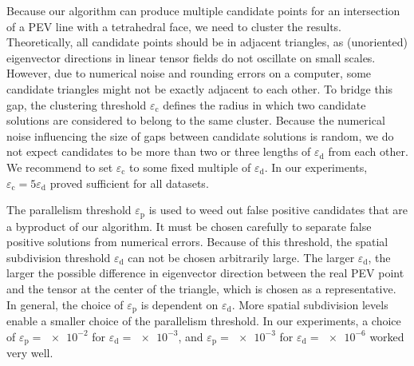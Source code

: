 %
Because our algorithm can produce multiple candidate points for an intersection
of a \ac{PEV} line with a tetrahedral face, we need to cluster the results.
%
Theoretically, all candidate points should be in adjacent triangles, as
(unoriented) eigenvector directions in linear tensor fields do not oscillate
on small scales.
%
However, due to numerical noise and rounding errors on a computer, some
candidate triangles might not be exactly adjacent to each other.
%
To bridge this gap, the clustering threshold $\varepsilon_\mathrm{c}$ defines
the radius in which two candidate solutions are considered to belong to the same
cluster.
%
Because the numerical noise influencing the size of gaps between candidate
solutions is random, we do not expect candidates to be more than two or three
lengths of $\varepsilon_\mathrm{d}$ from each other.
%
We recommend to set $\varepsilon_\mathrm{c}$ to some fixed multiple of
$\varepsilon_\mathrm{d}$.
%
In our experiments, $\varepsilon_\mathrm{c} = 5 \varepsilon_\mathrm{d}$ proved
sufficient for all datasets.
%

%
The parallelism threshold $\varepsilon_\mathrm{p}$ is used to weed out false
positive candidates that are a byproduct of our algorithm.
%
It must be chosen carefully to separate false positive solutions from numerical
errors.
%
Because of this threshold, the spatial subdivision threshold
$\varepsilon_\mathrm{d}$ can not be chosen arbitrarily large.
%
The larger $\varepsilon_\mathrm{d}$, the larger the possible difference in
eigenvector direction between the real \ac{PEV} point and the tensor at the
center of the triangle, which is chosen as a representative.
%
In general, the choice of $\varepsilon_\mathrm{p}$ is dependent on
$\varepsilon_\mathrm{d}$.
%
More spatial subdivision levels enable a smaller choice of the parallelism
threshold.
%
In our experiments, a choice of $\varepsilon_\mathrm{p} = \num{e-2}$ for
$\varepsilon_\mathrm{d} = \num{e-3}$, and $\varepsilon_\mathrm{p} = \num{e-3}$
for $\varepsilon_\mathrm{d} = \num{e-6}$ worked very well.
%